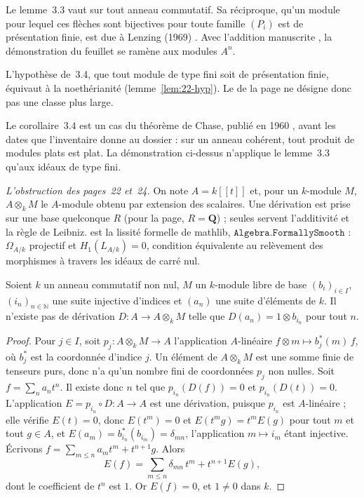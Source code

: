 \begin{remarque}
Le lemme~3.3 vaut sur tout anneau commutatif. Sa réciproque, qu'un module pour lequel ces flèches sont bijectives pour toute famille $(P_i)$ est de présentation finie, est due à Lenzing (1969) \cite{lenzing1969}. Avec l'addition manuscrite , la démonstration du feuillet se ramène aux modules $A^n$.
\end{remarque}

\begin{remarque}
L'hypothèse de~3.4, que tout module de type fini soit de présentation finie, équivaut à la noethérianité (lemme~\ref{lem:22-hyp}). Le  de la page ne désigne donc pas une classe plus large.
\end{remarque}

\begin{remarque}
Le corollaire~3.4 est un cas du théorème de Chase, publié en 1960 \cite{chase1960}, avant les dates que l'inventaire donne au dossier : sur un anneau cohérent, tout produit de modules plats est plat. La démonstration ci-dessus n'applique le lemme~3.3 qu'aux idéaux de type fini.
\end{remarque}

\noindent\emph{L'obstruction des pages~22 et~24.} On note $A = k[[t]]$ et, pour un $k$-module $M$, $A \otimes_k M$ le $A$-module obtenu par extension des scalaires. Une dérivation est prise sur une base quelconque $R$ (pour la page, $R = \mathbf Q$) ; seules servent l'additivité et la règle de Leibniz.  est la lissité formelle de mathlib, $\mathtt{Algebra.FormallySmooth}$ : $\Omega_{A/k}$ projectif et $H_1(L_{A/k}) = 0$, condition équivalente au relèvement des morphismes à travers les idéaux de carré nul.

\begin{lemme}\label{lem:22-obstruction}
Soient $k$ un anneau commutatif non nul, $M$ un $k$-module libre de base $(b_i)_{i \in I}$, $(i_n)_{n \in \mathbb N}$ une suite injective d'indices et $(a_n)$ une suite d'éléments de $k$. Il n'existe pas de dérivation $D : A \to A \otimes_k M$ telle que $D(a_n) = 1 \otimes b_{i_n}$ pour tout $n$.
\end{lemme}

\begin{proof}
Pour $j \in I$, soit $p_j : A \otimes_k M \to A$ l'application $A$-linéaire $f \otimes m \mapsto b_j^*(m)\, f$, où $b_j^*$ est la coordonnée d'indice $j$. Un élément de $A \otimes_k M$ est une somme finie de tenseurs purs, donc n'a qu'un nombre fini de coordonnées $p_j$ non nulles. Soit $f = \sum_n a_n t^n$. Il existe donc $n$ tel que $p_{i_n}(D(f)) = 0$ et $p_{i_n}(D(t)) = 0$. L'application $E = p_{i_n} \circ D : A \to A$ est une dérivation, puisque $p_{i_n}$ est $A$-linéaire ; elle vérifie $E(t) = 0$, donc $E(t^m) = 0$ et $E(t^m g) = t^m E(g)$ pour tout $m$ et tout $g \in A$, et $E(a_m) = b_{i_n}^*(b_{i_m}) = \delta_{mn}$, l'application $m \mapsto i_m$ étant injective. Écrivons $f = \sum_{m \leq n} a_m t^m + t^{n+1} g$. Alors
\[ E(f) = \sum_{m \leq n} \delta_{mn}\, t^m + t^{n+1} E(g), \]
dont le coefficient de $t^n$ est $1$. Or $E(f) = 0$, et $1 \neq 0$ dans $k$.
\end{proof}


